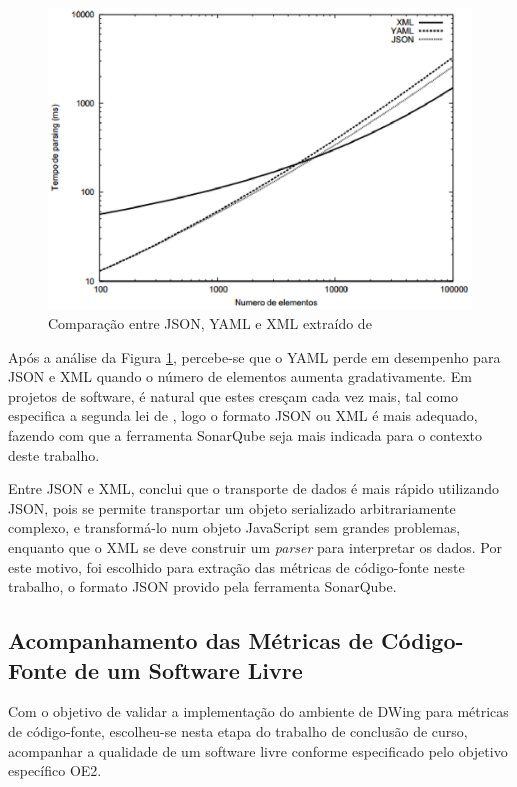 \begin{figure}[ht!]
\centering
\includegraphics[keepaspectratio=false,scale=1]{figuras/json.eps}
\caption{Comparação entre JSON, YAML e XML extraído de }
\label{jsonvsyaml}
\end{figure}
\FloatBarrier

Após a análise da Figura \ref{jsonvsyaml}, percebe-se que o YAML perde em desempenho para JSON e XML quando o número de elementos aumenta gradativamente. Em projetos de software, é natural que estes cresçam cada vez mais, tal como especifica a segunda lei de , logo o formato JSON ou XML é mais adequado, fazendo com que a ferramenta SonarQube seja mais indicada para o contexto deste trabalho.

Entre JSON e XML,  conclui que o transporte de dados é mais rápido utilizando JSON, pois se permite transportar
um objeto serializado arbitrariamente complexo, e transformá-lo num objeto
JavaScript sem grandes problemas, enquanto que o XML se deve construir um \textit{parser} para interpretar os dados. Por este motivo, foi escolhido para extração das métricas de código-fonte neste trabalho, o formato JSON provido pela ferramenta SonarQube. 


\subsection{Acompanhamento das Métricas de Código-Fonte de um Software Livre}

Com o objetivo de validar a implementação do ambiente de DWing para métricas de código-fonte, escolheu-se nesta etapa do trabalho de conclusão de curso, acompanhar a qualidade de um software livre conforme especificado pelo objetivo específico OE2.

